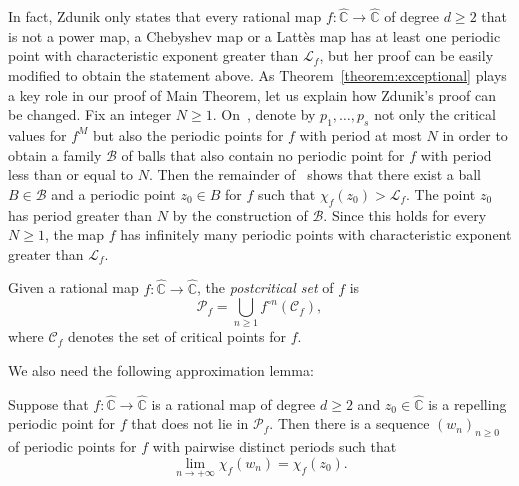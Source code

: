 \begin{remark}
In fact, Zdunik only states that every rational map $f \colon \widehat{\mathbb{C}} \to \widehat{\mathbb{C}}$ of degree $d \geq 2$ that is not a power map, a Chebyshev map or a Lattès map has at least one periodic point with characteristic exponent greater than $\mathcal{L}_{f}$, but her proof can be easily modified to obtain the statement above. As Theorem~\ref{theorem:exceptional} plays a key role in our proof of Main Theorem, let us explain how Zdunik's proof can be changed. Fix an integer $N \geq 1$. On~\cite[p.\,260]{Z2014}, denote by $p_{1}, \dotsc, p_{s}$ not only the critical values for $f^{M}$ but also the periodic points for $f$ with period at most $N$ in order to obtain a family $\mathcal{B}$ of balls that also contain no periodic point for $f$ with period less than or equal to $N$. Then the remainder of~\cite[Proof of Prop.\,4]{Z2014} shows that there exist a ball $B \in \mathcal{B}$ and a periodic point $z_{0} \in B$ for $f$ such that $\chi_{f}(z_{0}) > \mathcal{L}_{f}$. The point $z_{0}$ has period greater than $N$ by the construction of $\mathcal{B}$. Since this holds for every $N \geq 1$, the map $f$ has infinitely many periodic points with characteristic exponent greater than $\mathcal{L}_{f}$.
\end{remark}

Given a rational map $f \colon \widehat{\mathbb{C}} \to \widehat{\mathbb{C}}$, the \emph{postcritical set} of $f$ is
\[
\mathcal{P}_{f} = \bigcup_{n \geq 1} f^{\circ n}(\mathcal{C}_{f}),
\]
where $\mathcal{C}_{f}$ denotes the set of critical points for $f$.

We also need the following approximation lemma:

\begin{lemma}
\label{lemma:homoclinic}
Suppose that $f \colon \widehat{\mathbb{C}} \to \widehat{\mathbb{C}}$ is a rational map of degree $d \geq 2$ and $z_{0} \in \widehat{\mathbb{C}}$ is a repelling periodic point for $f$ that does not lie in $\mathcal{P}_{f}$. Then there is a sequence $(w_{n})_{n \geq 0}$ of periodic points for $f$ with pairwise distinct periods such that
\[
\lim_{n \to +\infty} \chi_{f}(w_{n}) = \chi_{f}(z_{0}).
\]
\end{lemma}

